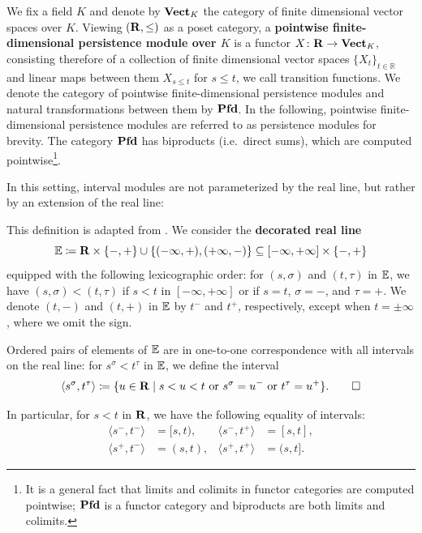 We fix a field $K$ and denote by $\operatorname{\mathbf{Vect}}_\mathit{K}$ the category of finite dimensional vector spaces over $K$. Viewing $(\mathbf{R}, \mathord{\leq})$ as a poset category, a \textbf{pointwise finite-dimensional persistence module over $K$} is a functor $X \colon \mathbf{R} \to \operatorname{\mathbf{Vect}}_\mathit{K}$, consisting therefore of a collection of finite dimensional vector spaces $\{X_t\}_{t \in \mathbb{R}}$ and linear maps between them $X_{s \leq t}$ for $s \leq t$,  we call transition functions. We denote the category of pointwise finite-dimensional persistence modules and natural transformations between them by $\operatorname{\mathbf{Pfd}}$. In the following, pointwise finite-dimensional persistence modules are referred to as persistence modules for brevity. The category $\operatorname{\mathbf{Pfd}}$ has biproducts (i.e.\ direct sums), which are computed pointwise\footnote{It is a general fact that limits and colimits in functor categories are computed pointwise; $\operatorname{\mathbf{Pfd}}$ is a functor category and biproducts are both limits and colimits.}.

In this setting, interval modules are not parameterized by the real line, but rather by an extension of the real line:

\begin{definition}
\label{C!def:decoratedE}
  This definition is adapted from \cite[]{BauerLesnick2015}.
  We consider the \textbf{decorated real line}
  \[
    \mathbb{E} \coloneq \mathbf{R} \times \{-, +\} \cup \{(-\infty, +), (+\infty, -)\} \subseteq [-\infty, +\infty] \times \{-, +\}
  \]
  equipped with the following lexicographic order: for $(s, \sigma)$ and $(t, \tau)$ in $\mathbb{E}$, we have $(s, \sigma) < (t, \tau)$ if $s < t$ in $[-\infty, +\infty]$ or if $s = t$, $\sigma = -$, and $\tau = +$. We denote $(t, -)$ and $(t, +)$ in $\mathbb{E}$ by $t^-$ and $t^+$, respectively, except when $t = \pm \infty$, where we omit the sign.

  Ordered pairs of elements of $\mathbb{E}$ are in one-to-one correspondence with all intervals on the real line: for $s^\sigma < t^\tau$ in $\mathbb{E}$, we define the interval
  \[
    \langle s^\sigma, t^\tau \rangle \coloneq \{u \in \mathbf{R} \mid s < u < t \text{ or } s^\sigma = u^- \text{ or } t^\tau = u^+\}.
    \qedhere
  \]
\end{definition}

In particular, for $s < t$ in $\mathbf{R}$, we have the following equality of intervals:
\begin{align*}
  \langle s^-, t^- \rangle & = [s, t), &
  \langle s^-, t^+ \rangle & = [s, t], \\
  \langle s^+, t^- \rangle & = (s, t), &
  \langle s^+, t^+ \rangle & = (s, t].
\end{align*}

